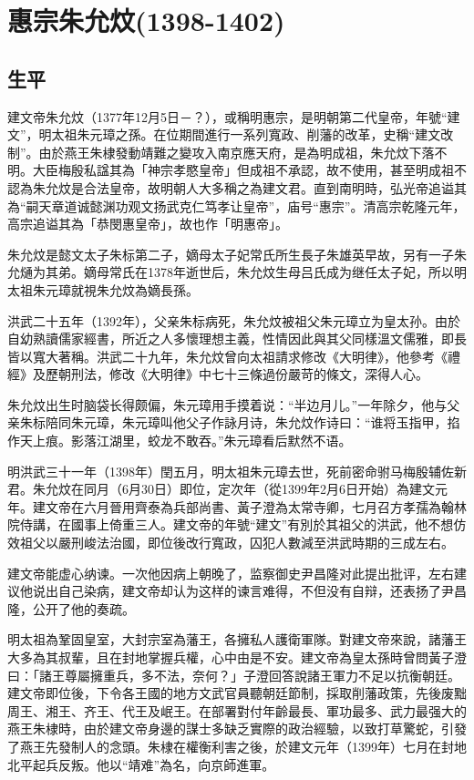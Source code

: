 
\section{惠宗朱允炆\tiny(1398-1402)}

\subsection{生平}

建文帝朱允炆（1377年12月5日－？），或稱明惠宗，是明朝第二代皇帝，年號“建文”，明太祖朱元璋之孫。在位期間進行一系列寬政、削藩的改革，史稱“建文改制”。由於燕王朱棣發動靖難之變攻入南京應天府，是為明成祖，朱允炆下落不明。大臣梅殷私諡其為「神宗孝愍皇帝」但成祖不承認，故不使用，甚至明成祖不認為朱允炆是合法皇帝，故明朝人大多稱之為建文君。直到南明時，弘光帝追谥其為“嗣天章道诚懿渊功观文扬武克仁笃孝让皇帝”，庙号“惠宗”。清高宗乾隆元年，高宗追谥其為「恭閔惠皇帝」，故也作「明惠帝」。

朱允炆是懿文太子朱标第二子，嫡母太子妃常氏所生長子朱雄英早故，另有一子朱允熥为其弟。嫡母常氏在1378年逝世后，朱允炆生母吕氏成为继任太子妃，所以明太祖朱元璋就視朱允炆為嫡長孫。

洪武二十五年（1392年），父亲朱标病死，朱允炆被祖父朱元璋立为皇太孙。由於自幼熟讀儒家經書，所近之人多懷理想主義，性情因此與其父同樣溫文儒雅，即長皆以寬大著稱。洪武二十九年，朱允炆曾向太祖請求修改《大明律》，他參考《禮經》及歷朝刑法，修改《大明律》中七十三條過份嚴苛的條文，深得人心。

朱允炆出生时脑袋长得颇偏，朱元璋用手摸着说：“半边月儿。”一年除夕，他与父亲朱标陪同朱元璋，朱元璋叫他父子作詠月诗，朱允炆作诗曰：“谁将玉指甲，掐作天上痕。影落江湖里，蛟龙不敢吞。”朱元璋看后默然不语。

明洪武三十一年（1398年）閏五月，明太祖朱元璋去世，死前密命驸马梅殷辅佐新君。朱允炆在同月（6月30日）即位，定次年（從1399年2月6日开始）為建文元年。建文帝在六月晉用齊泰為兵部尚書、黃子澄為太常寺卿，七月召方孝孺為翰林院侍講，在國事上倚重三人。建文帝的年號“建文”有別於其祖父的洪武，他不想仿效祖父以嚴刑峻法治國，即位後改行寬政，囚犯人數減至洪武時期的三成左右。

建文帝能虚心纳谏。一次他因病上朝晚了，监察御史尹昌隆对此提出批评，左右建议他说出自己染病，建文帝却认为这样的谏言难得，不但没有自辩，还表扬了尹昌隆，公开了他的奏疏。

明太祖為鞏固皇室，大封宗室為藩王，各擁私人護衛軍隊。對建文帝來說，諸藩王大多為其叔輩，且在封地掌握兵權，心中由是不安。建文帝為皇太孫時曾問黃子澄曰：「諸王尊屬擁重兵，多不法，奈何？」子澄回答說諸王軍力不足以抗衡朝廷。建文帝即位後，下令各王國的地方文武官員聽朝廷節制，採取削藩政策，先後废黜周王、湘王、齐王、代王及岷王。在部署對付年齡最長、軍功最多、武力最强大的燕王朱棣時，由於建文帝身邊的謀士多缺乏實際的政治經驗，以致打草驚蛇，引發了燕王先發制人的念頭。朱棣在權衡利害之後，於建文元年（1399年）七月在封地北平起兵反叛。他以“靖难”為名，向京師進軍。

